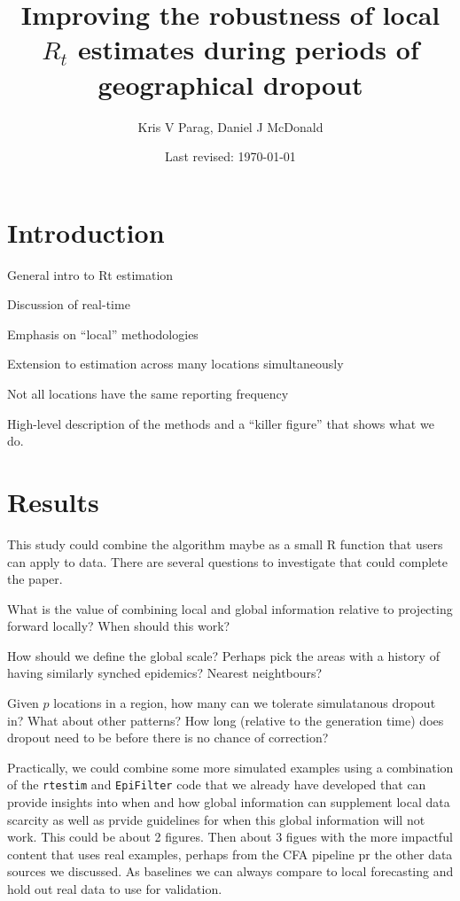 \documentclass[12pt]{article}
\title{\huge Improving the robustness of local $R_t$ estimates during periods of geographical dropout}
\author{Kris V Parag, Daniel J McDonald}
\date{Last revised: \today}
\begin{document}
\maketitle

\section*{Introduction}

\bitem
\item General intro to Rt estimation
\item Discussion of real-time
\item Emphasis on ``local'' methodologies
\item Extension to estimation across many locations simultaneously 
\item Not all locations have the same reporting frequency
\item High-level description of the methods and a ``killer figure'' that shows
what we do.
\eitem


\section*{Results}

This study could combine the algorithm maybe as a small R function that users
can apply to data. There are several questions to investigate that
could complete the paper. 

\bitem
\item What is the value of combining local and global information relative to
projecting forward locally? When should this work?
\item How should we define the global scale? Perhaps pick the areas with a
history of having similarly synched epidemics? Nearest neightbours?
\item Given $p$ locations in a region, how many can we tolerate simulatanous
dropout in? What about other patterns? How long (relative to the generation
time) does dropout need to be before there is no chance of correction?
\eitem

Practically, we could combine some more simulated examples using a combination
of the \texttt{rtestim} and \texttt{EpiFilter} code that we already have
developed that can provide insights into when and how global information can
supplement local data scarcity as well as prvide guidelines for when this global
information will not work. This could be about 2 figures. Then about 3 figues
with the more impactful content that uses real examples, perhaps from the CFA
pipeline pr the other data sources we discussed. As baselines we can always
compare to local forecasting and hold out real data to use for validation. 
\end{document}
